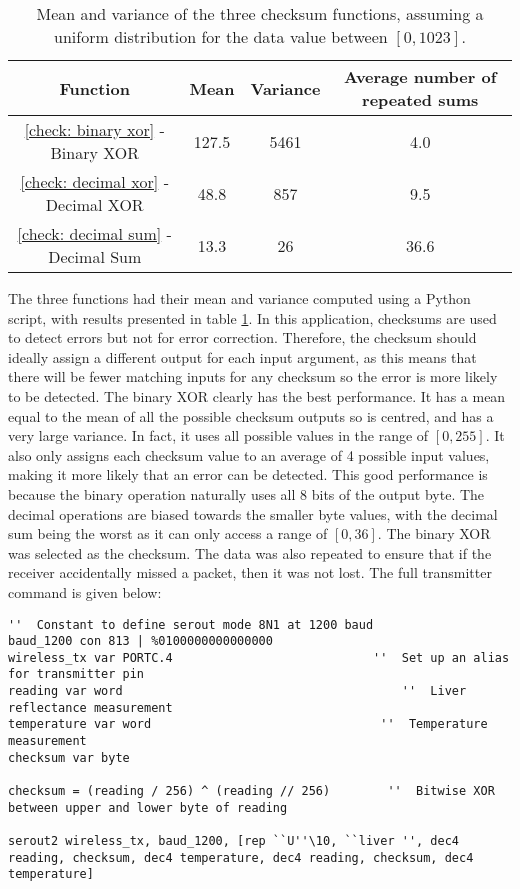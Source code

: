 \begin{table}[htbp]
	\begin{center}
	\caption{Mean and variance of the three checksum functions, assuming a uniform distribution for the data value between $[0,1023]$.}
	\label{tab: checksums}
	\begin{tabular}{|c|c|c|c|}
		\hline
		\textbf{Function} & \textbf{Mean} & \textbf{Variance} & \textbf{Average number of repeated sums}\\
		\hline
		\ref{check: binary xor} - Binary XOR & 127.5 & 5461 & 4.0\\
		\ref{check: decimal xor} - Decimal XOR & 48.8 & 857 & 9.5\\
		\ref{check: decimal sum} - Decimal Sum & 13.3 & 26 & 36.6\\
		\hline
	\end{tabular}
	\end{center}
\end{table}
The three functions had their mean and variance computed using a Python script, with results presented in table \ref{tab: checksums}. In this application, checksums are used to detect errors but not for error correction. Therefore, the checksum should ideally assign a different output for each input argument, as this means that there will be fewer matching inputs for any checksum so the error is more likely to be detected. The binary XOR clearly has the best performance. It has a mean equal to the mean of all the possible checksum outputs so is centred, and has a very large variance. In fact, it uses all possible values in the range of $[0,255]$. It also only assigns each checksum value to an average of 4 possible input values, making it more likely that an error can be detected. This good performance is because the binary operation naturally uses all 8 bits of the output byte. The decimal operations are biased towards the smaller byte values, with the decimal sum being the worst as it can only access a range of $[0,36]$. The binary XOR was selected as the checksum. The data was also repeated to ensure that if the receiver accidentally missed a packet, then it was not lost. The full transmitter command is given below:\\

\begin{lstlisting}
''  Constant to define serout mode 8N1 at 1200 baud
baud_1200 con 813 | %0100000000000000
wireless_tx var PORTC.4                            ''  Set up an alias for transmitter pin
reading var word                                       ''  Liver reflectance measurement
temperature var word                                ''  Temperature measurement
checksum var byte

checksum = (reading / 256) ^ (reading // 256)        ''  Bitwise XOR between upper and lower byte of reading

serout2 wireless_tx, baud_1200, [rep ``U''\10, ``liver '', dec4 reading, checksum, dec4 temperature, dec4 reading, checksum, dec4 temperature]
\end{lstlisting}

